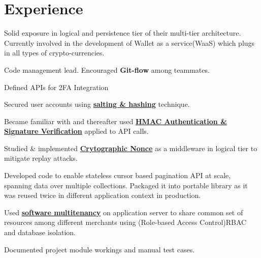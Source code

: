 \documentclass[]{deedy-resume-openfont}
\begin{document}
\begin{minipage}[t]{0.66\textwidth}


\section{Experience}

\vspace{\topsep} %
\begin{tightemize}
\item  Solid exposure in logical and persistence tier of their multi-tier
  architecture. Currently involved in the development of Wallet as a service(WaaS)
  which plugs in all types of crypto-currencies.
\item Code management lead. Encouraged \textbf{Git-flow} among teammates.
\item Defined APIs for 2FA Integration
\item Secured user accounts using \href{http://swlogs.me/blog/user-auth/}{\textbf{salting \& hashing}} technique.
\item Became familiar with and thereafter used  \href{http://swlogs.me/blog/hmac-authentication/}{\textbf{HMAC Authentication \& Signature Verification}} applied to API calls.
\item Studied \& implemented \href{http://swlogs.me/DIY/nonce-auth-systems/}{\textbf{Crytographic Nonce}}
  as a middleware in logical tier to mitigate replay attacks.
\item Developed code to enable stateless cursor based pagination API at scale, spanning data over multiple
  collections. Packaged it into portable library as it was reused twice in different application context in production.
\item Used \href{http://swlogs.me/DIY/multi-tenancy/}{\textbf{software multitenancy}} on application server to share common set of resources among
  different merchants using (Role-based Access Control)RBAC and database isolation.
\item Documented project module workings and manual test cases.
\end{tightemize}
\sectionsep


\end{minipage}
\end{document}
